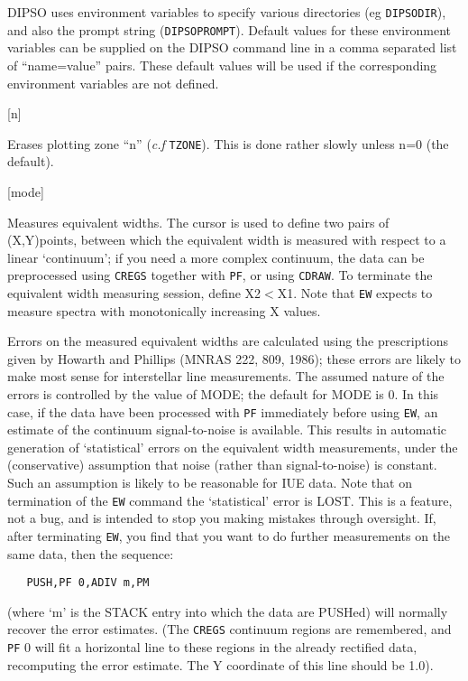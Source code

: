 \documentclass[twoside,11pt]{article}
\newcommand{\htmlref}[2]{#1}
\newcommand{\xlabel}[1]{}
\renewcommand{\_}{\texttt{\symbol{95}}}
\newcommand{\dipcom}[3] { \item [{#1}] {#2} \par }
\newcommand{\dipcom}[3] { \end{description}
                            \subsection{\xlabel{#1}{#1} - {#3}}
                            \label{COM:#1}
                            \begin{description}
                            \item [Syntax:] {\tt{#1} {#2}}
                            \par
                            \item [Description:]}
\begin{document}
\begin {description}
DIPSO uses environment variables to specify various directories (eg
\verb+DIPSODIR+), and also the prompt string (\verb+DIPSOPROMPT+).
Default values for these environment variables can be supplied
on the DIPSO command line in a comma separated list of ``name=value''
pairs. These default values will be used if the corresponding environment
variables are not defined. 

\dipcom{ERASE}{[n]}{Erases a plotting zone created by {\tt{TZONE}}} 
Erases plotting zone ``n'' ({\it c.f} \htmlref{{\tt{TZONE}}}{COM:TZONE}).  This is done rather slowly
unless n=0 (the default).

\dipcom{EW}{[mode]}{Measures equivalent widths}
Measures equivalent widths. The cursor is used to define two pairs of
(X,Y)points, between which the equivalent width is measured with
respect to a linear `continuum'; if you need a more complex continuum,
the data can be preprocessed using \htmlref{{\tt{CREGS}}}{COM:CREGS}  together with \htmlref{{\tt{PF}}}{COM:PF},  or using
\htmlref{{\tt{CDRAW}}}{COM:CDRAW}.  To terminate the equivalent width measuring session, define
X2$<$X1. Note that \htmlref{{\tt{EW}}}{COM:EW}  expects to measure spectra with monotonically
increasing X values.

Errors on the measured equivalent widths are calculated using the
prescriptions given by Howarth and Phillips (MNRAS 222, 809, 1986);
these errors are likely to make most sense for interstellar line
measurements. The assumed nature of the errors is controlled by the
value of MODE; the default for MODE is 0. In this case, if the data
have been processed with \htmlref{{\tt{PF}}}{COM:PF}  immediately before using \htmlref{{\tt{EW}}}{COM:EW},  an estimate
of the continuum signal-to-noise is available. This results in
automatic generation of `statistical' errors on the equivalent width
measurements, under the (conservative) assumption that noise (rather
than signal-to-noise) is constant. Such an assumption is likely to be
reasonable for IUE data. Note that on termination of the \htmlref{{\tt{EW}}}{COM:EW}  command
the `statistical' error is LOST. This is a feature, not a bug, and is
intended to stop you making mistakes through oversight. If, after
terminating \htmlref{{\tt{EW}}}{COM:EW},  you find that you want to do further measurements on
the same data, then the sequence:

\begin{verbatim}
   PUSH,PF 0,ADIV m,PM
\end{verbatim}

(where `m' is the STACK entry into which the data are PUSHed) will
normally recover the error estimates. (The \htmlref{{\tt{CREGS}}}{COM:CREGS}  continuum regions are
remembered, and \htmlref{{\tt{PF}}}{COM:PF}  0 will fit a horizontal line to these regions in
the already rectified data, recomputing the error estimate. The Y
coordinate of this line should be 1.0).


\end{description}
\end{document}
